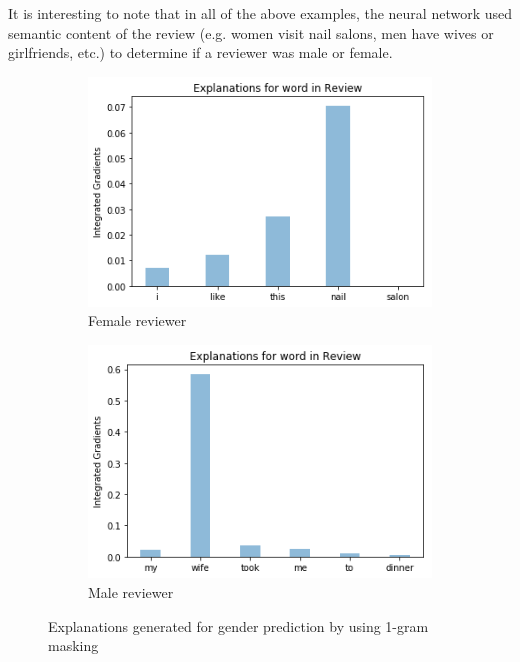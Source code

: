 It is interesting to note that in all of the above examples, the neural network used semantic content of the review (e.g. women visit nail salons, men have wives or girlfriends, etc.) to determine if a reviewer was male or female.

\begin{figure}[t]
	\centering
	\begin{subfigure}{0.45\textwidth}
		\centering
		\includegraphics[width=\linewidth]{figure9}
		\caption{Female reviewer}
		\label{fig:gp:int-grad:female}
	\end{subfigure} %
	\begin{subfigure}{0.45\textwidth}
		\centering
		\includegraphics[width=\linewidth]{figure8}
		\caption{Male reviewer}
		\label{fig:gp:int-grad:male}
	\end{subfigure}
	\caption{Explanations generated for gender prediction by using 1-gram masking}
	\label{fig:gp:int-grad}
\end{figure}

